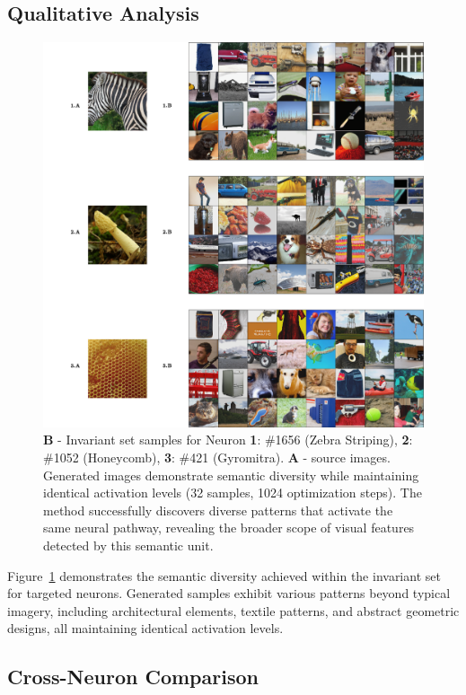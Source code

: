 \subsection{Qualitative Analysis}

\begin{figure}[h]
\centering
\includegraphics[width=\linewidth]{figures/main/sae_results_1.png}
\caption{ \textbf{B} - Invariant set samples for Neuron \textbf{1}: \#1656 (Zebra Striping), \textbf{2}: \#1052 (Honeycomb), \textbf{3}: \#421 (Gyromitra). \textbf{A} - source images. Generated images demonstrate semantic diversity while maintaining identical activation levels (32 samples, 1024 optimization steps). The method successfully discovers diverse patterns that activate the same neural pathway, revealing the broader scope of visual features detected by this semantic unit.}
\label{fig:experiment_1_1}
\end{figure}

Figure~\ref{fig:experiment_1_1} demonstrates the semantic diversity achieved within the invariant set for targeted neurons. Generated samples exhibit various patterns beyond typical imagery, including architectural elements, textile patterns, and abstract geometric designs, all maintaining identical activation levels.

\subsection{Cross-Neuron Comparison}

